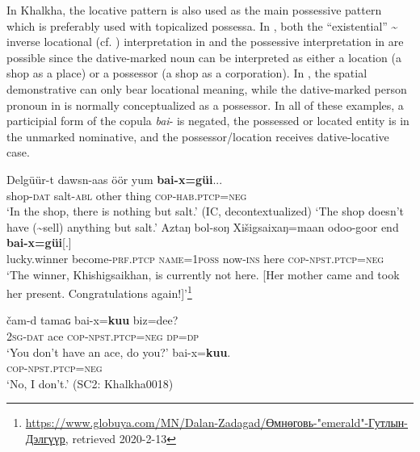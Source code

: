 \documentclass[output=paper,colorlinks,citecolor=brown,chinesefont]{langscibook}
\begin{document}
In Khalkha, the locative pattern is also used as the main possessive pattern which is preferably used with topicalized possessa. In , both the “existential” {\textasciitilde} inverse locational (cf. \citealt[1]{Creissels2014}) interpretation in  and the possessive interpretation in  are possible since the dative-marked noun can be interpreted as either a location (a shop as a place) or a possessor (a shop as a corporation). In , the spatial demonstrative can only bear locational meaning, while the dative-marked person pronoun in  is normally conceptualized as a possessor. In all of these examples, a participial form of the copula \textit{bai}{}- is negated, the possessed or located entity is in the unmarked nominative, and the possessor/location receives dative-locative case. 

\ea\label{ex:kha:26}
        \gll Delgüür-t dawsn-aas öör yum {\textbf{bai-x=güi}...} \\ 
             shop-\textsc{dat}   salt-\textsc{abl} other thing \textsc{cop-hab.ptcp=neg} \\
    \ea\label{ex:kha:26a}
        \glt ‘In the shop, there is nothing but salt.’ (IC, decontextualized) 
    \ex\label{ex:kha:26b}
        \glt ‘The shop doesn’t have ({\textasciitilde}sell) anything but salt.’
    \z 
\z 
\ea\label{ex:kha:27}
    \gll Aztaŋ bol-soŋ Xišigsaixaŋ=maan odoo-goor end \textbf{bai-x=güi}[.]  \\ 
         lucky.winner become-\textsc{prf.ptcp} \textsc{name=1poss} now-\textsc{ins} here \textsc{cop-npst.ptcp=neg} \\
     ‘The winner, Khishigsaikhan, is currently not here. [Her mother came and took her present. Congratulations again!]’\footnote{\href{https://www.globuya.com/MN/Dalan-Zadagad/Өмнөговь-"emerald"-Гутлын-Дэлгүүр}{https://www.globuya.com/MN/Dalan-Zadagad/Өмнөговь-"emerald"-Гутлын-Дэлгүүр}, retrieved 2020-2-13}
\z 

\ea\label{ex:kha:28}
    \begin{xlist}
    \label{ex:kha:28A}
        \gll čam-d tamaɢ bai-x=\textbf{kuu} biz=dee? \\ 
             \textsc{2sg-dat} ace \textsc{cop-npst.ptcp=neg} \textsc{dp=dp} \\
        \glt  ‘You don’t have an ace, do you?’   
    \label{ex:kha:28B}
        \gll bai-x=\textbf{kuu}. \\
            \textsc{cop-npst.ptcp=neg} \\
        \glt ‘No, I don’t.’ (SC2: Khalkha0018)
    \end{xlist} 
\z
\end{document}
